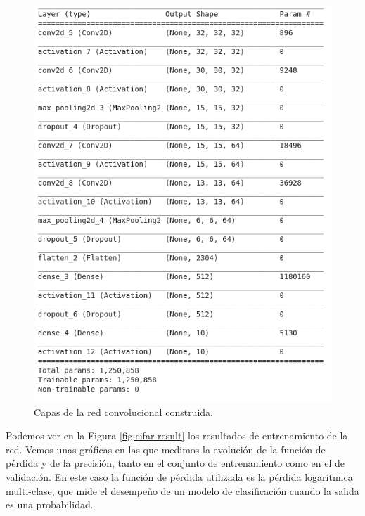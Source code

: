 \documentclass[
  a4paper,
  12pt,
  spanish,
]{scrartcl}
\theoremstyle{teorema-style}
\begin{document}

\begin{figure}[h]
  \centering
  \includegraphics[width=.7\textwidth]{img/model}
  \caption{Capas de la red convolucional construida.}
  \label{fig:model}
\end{figure}

Podemos ver en la Figura \ref{fig:cifar-result} los resultados de entrenamiento de la red. Vemos unas gráficas en las que medimos la evolución de la función de pérdida y de la precisión, tanto en el conjunto de entrenamiento como en el de validación. En este caso la función de pérdida utilizada es la \href{http://wiki.fast.ai/index.php/Log_Loss}{pérdida logarítmica multi-clase}, que mide el desempeño de un modelo de clasificación cuando la salida es una probabilidad.
\end{document}
